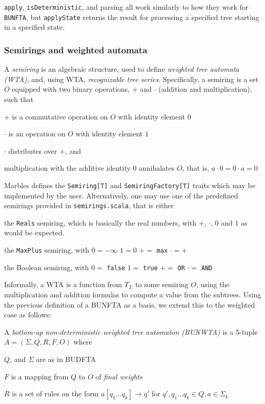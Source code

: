 \texttt{apply}, \texttt{isDeterministic}, and parsing all work similarly to
how they work for \texttt{BUNFTA}, but \texttt{applyState} returns the
result for processing a specified tree starting in a specified state. 

\subsubsection{Semirings and weighted automata}

A \emph{semiring} is an algebraic structure, used to define \emph{weighted
tree automata (WTA)}, and, using WTA, \emph{recognizable tree series}.
Specifically, a semiring is a set $O$ equipped with two binary operations,
$+$ and $\cdot$ (addition and multiplication), such that
\begin{compactitem}
\item $+$ is a commutative operation on $O$ with identity element $0$
\item $\cdot$ is an operation on $O$ with identity element $1$
\item $\cdot$ distributes over $+$, and
\item multiplication with the additive identity $0$ annihalates $O$, that
is, $a \cdot 0 = 0 \cdot a = 0$
\end{compactitem}

Marbles defines the \texttt{Semiring[T]} and \texttt{SemiringFactory[T]}
traits which may be implemented by the user. Alternatively, one may use one
of the predefined semirings provided in \texttt{semirings.scala}, that is
either
\begin{compactitem}
\item the \texttt{Reals} semiring, which is basically the real numbers, with $+$, $\cdot$, $0$ and $1$ as would be expected.
\item the \texttt{MaxPlus} semiring, with
\subitem $0 = -\infty$
\subitem $1 = 0$ 
\subitem $+=$ \texttt{max}
\subitem $\cdot=+$
\item the Boolean semiring, with
\subitem $0 =$ \texttt{false}
\subitem $1 =$ \texttt{true}
\subitem $+=$ \texttt{OR}
\subitem $\cdot=$ \texttt{AND}
\end{compactitem}

Informally, a WTA is a function from $T_\Sigma$ to some semiring $O$, using
the multiplication and addition formulas to compute a value from the
subtrees. Using the previous definition of a BUNFTA as a basis, we extend
this to the weighted case as follows:

A \emph{bottom-up non-deterministic weighted tree automaton (BUNWTA)} is a
5-tuple $A = (\Sigma, Q, R, F, O)$ where
\begin{compactitem}
\item $Q$, and $\Sigma$ are as in BUDFTA
\item $F$ is a mapping from $Q$ to $O$ of \emph{final weights}
\item $R$ is a set of rules on the form
$a[q_1 \ldots q_k] \rightarrow q'$ for $q',q_1 \ldots q_k \in Q, a \in
\Sigma_k$
\end{compactitem}

